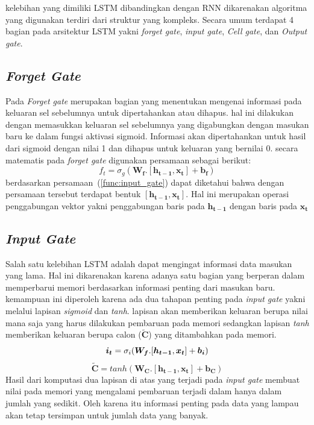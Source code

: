 kelebihan yang dimiliki LSTM dibandingkan dengan RNN dikarenakan algoritma yang digunakan terdiri dari struktur yang kompleks. Secara umum terdapat 4 bagian pada arsitektur LSTM yakni \textit{forget gate}, \textit{input gate}, \textit{Cell gate}, dan \textit{Output gate}. 
\subsection{\textit{Forget Gate}}
Pada \textit{Forget gate} merupakan bagian yang menentukan mengenai informasi pada keluaran sel sebelumnya untuk dipertahankan atau dihapus. hal ini dilakukan dengan memasukkan keluaran sel sebelumnya yang digabungkan dengan masukan baru ke dalam fungsi aktivasi sigmoid. Informasi akan dipertahankan untuk hasil dari sigmoid dengan nilai 1 dan dihapus untuk keluaran yang bernilai 0. secara matematis pada \textit{forget gate} digunakan persamaan sebagai berikut:
\begin{equation}
	f_t = \sigma_g(\boldsymbol{W_{f}}.[\boldsymbol{h_{t-1}}, \boldsymbol{x_t}] + \boldsymbol{b_f})
	\label{func:input_gate}
\end{equation} 
berdasarkan persamaan~(\ref{func:input_gate}) dapat diketahui bahwa dengan persamaan tersebut terdapat bentuk $[\boldsymbol{h_{t-1}}, \boldsymbol{x_t}]$. Hal ini merupakan operasi penggabungan vektor yakni penggabungan baris pada $\boldsymbol{h_{t-1}}$ dengan baris pada $\boldsymbol{x_t}$
\subsection{\textit{Input Gate}}
Salah satu kelebihan LSTM adalah dapat mengingat informasi data masukan yang lama. Hal ini dikarenakan karena adanya satu bagian yang berperan dalam memperbarui memori berdasarkan informasi penting dari masukan baru. kemampuan ini diperoleh karena ada dua tahapan penting pada \textit{input gate} yakni melalui lapisan \textit{sigmoid} dan \textit{tanh}. lapisan akan memberikan keluaran berupa nilai mana saja yang harus dilakukan pembaruan pada memori sedangkan lapisan \textit{tanh} memberikan keluaran berupa calon ($\boldsymbol{\tilde{C}}$) yang ditambahkan pada memori. 
\begin{equation}
	\boldsymbol{i_t} = \sigma_i(\boldsymbol{W_{f}}.[\boldsymbol{h_{t-1}}, \boldsymbol{x_t}] + \boldsymbol{b_i})\\
	\label{func:input}
\end{equation}
\begin{equation}
	\boldsymbol{\tilde{C}} = tanh(\boldsymbol{W_{C}}.[\boldsymbol{h_{t-1}}, \boldsymbol{x_t}] + \boldsymbol{b_C})
	\label{func:C-tilde}
\end{equation}
Hasil dari komputasi dua lapisan di atas yang terjadi pada \textit{input gate} membuat nilai pada memori yang mengalami pembaruan terjadi dalam hanya dalam jumlah yang sedikit. Oleh karena itu informasi penting pada data yang lampau akan tetap tersimpan untuk jumlah data yang banyak.

